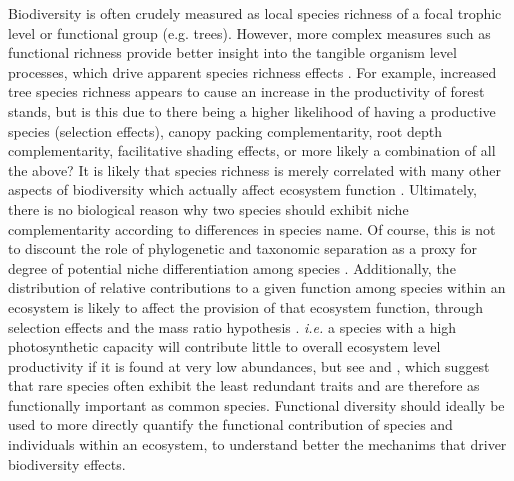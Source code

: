 \begin{refsection}
Biodiversity is often crudely measured as local species richness of a focal trophic level or functional group (e.g. trees). However, more complex measures such as functional richness provide better insight into the tangible organism level processes, which drive apparent species richness effects \citep{Finegan2015, Scherer-Lorenzen2014, Petchey2006}. For example, increased tree species richness appears to cause an increase in the productivity of forest stands, but is this due to there being a higher likelihood of having a productive species (selection effects), canopy packing complementarity, root depth complementarity, facilitative shading effects, or more likely a combination of all the above? It is likely that species richness is merely correlated with many other aspects of biodiversity which actually affect ecosystem function \citep{Mlambo2014, Scherer-Lorenzen2014}. Ultimately, there is no biological reason why two species should exhibit niche complementarity according to differences in species name. Of course, this is not to discount the role of phylogenetic and taxonomic separation as a proxy for degree of potential niche differentiation among species \citep{Flynn2011, Petchey2002}. Additionally, the distribution of relative contributions to a given function among species within an ecosystem is likely to affect the provision of that ecosystem function, through selection effects and the mass ratio hypothesis \citep{Chisholm2013b}. \textit{i.e.} a species with a high photosynthetic capacity will contribute little to overall ecosystem level productivity if it is found at very low abundances, but see \citet{Violle2017} and \citet{Soliveres2016}, which suggest that rare species often exhibit the least redundant traits and are therefore as functionally important as common species. Functional diversity should ideally be used to more directly quantify the functional contribution of species and individuals within an ecosystem, to understand better the mechanims that driver biodiversity effects.


\end{refsection}

